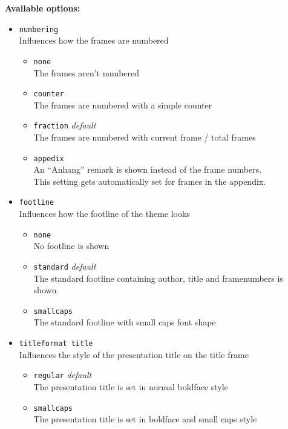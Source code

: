 \documentclass[12pt,a4paper]{scrartcl}
\begin{document}
	\textbf{Available options:}
	\begin{itemize}
		\item \texttt{numbering} \\
				Influences how the frames are numbered
				\begin{itemize}
					\item \texttt{none} \\
					The frames aren't numbered
					\item \texttt{counter} \\
					The frames are numbered with a simple counter
					\item \texttt{fraction}			\hfill \textit{default} \\
					The frames are numbered with current frame / total frames
					\item \texttt{appedix} \\
					An \enquote{Anhang} remark is shown instead of the frame numbers. \\
					This setting gets automatically set for frames in the appendix.
				\end{itemize}
		\item \texttt{footline} \\
				Influences how the footline of the theme looks
				\begin{itemize}
					\item \texttt{none} \\
					No footline is shown
					\item \texttt{standard}			\hfill \textit{default} \\
					The standard footline containing author, title and framenumbers is shown.
					\item \texttt{smallcaps} \\
					The standard footline with small caps font shape
				\end{itemize}
		\item \texttt{titleformat title} \\
				Influences the style of the presentation title on the title frame
				\begin{itemize}
					\item \texttt{regular}			\hfill \textit{default}\\
					The presentation title is set in normal boldface style
					\item \texttt{smallcaps} \\
					The presentation title is set in boldface and small caps style
				\end{itemize}
	\end{itemize}
\end{document}
